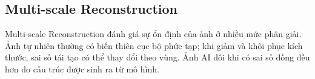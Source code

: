 \subsection{Multi-scale Reconstruction}
Multi-scale Reconstruction đánh giá sự ổn định của ảnh ở nhiều mức phân giải. Ảnh tự nhiên thường có biến thiên cục bộ phức tạp; khi giảm và khôi phục kích thước, sai số tái tạo có thể thay đổi theo vùng. Ảnh AI đôi khi có sai số đồng đều hơn do cấu trúc được sinh ra từ mô hình.
